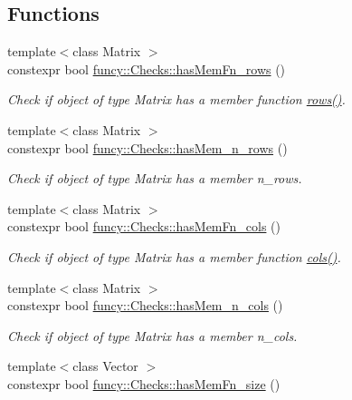 \subsection*{Functions}
\begin{DoxyCompactItemize}
\item 
{\footnotesize template$<$class Matrix $>$ }\\constexpr bool \hyperlink{group__ConceptCheck_gab1d22f4faad380ccd489734763c5f39c}{funcy\-::\-Checks\-::has\-Mem\-Fn\-\_\-rows} ()
\begin{DoxyCompactList}\small\item\em Check if object of type Matrix has a member function \hyperlink{namespacefuncy_1_1LinearAlgebra_aea4d8c30f47543a340dd7d1efda08b6d}{rows()}. \end{DoxyCompactList}\item 
{\footnotesize template$<$class Matrix $>$ }\\constexpr bool \hyperlink{group__ConceptCheck_gaaa8a18550989f64d04281c686b0d5ebd}{funcy\-::\-Checks\-::has\-Mem\-\_\-n\-\_\-rows} ()
\begin{DoxyCompactList}\small\item\em Check if object of type Matrix has a member n\-\_\-rows. \end{DoxyCompactList}\item 
{\footnotesize template$<$class Matrix $>$ }\\constexpr bool \hyperlink{group__ConceptCheck_gaba617e734e07fb6c0ef1c519149d9381}{funcy\-::\-Checks\-::has\-Mem\-Fn\-\_\-cols} ()
\begin{DoxyCompactList}\small\item\em Check if object of type Matrix has a member function \hyperlink{namespacefuncy_1_1LinearAlgebra_adee762dc2457194e15c0a5e678babcb2}{cols()}. \end{DoxyCompactList}\item 
{\footnotesize template$<$class Matrix $>$ }\\constexpr bool \hyperlink{group__ConceptCheck_ga196a98efffbe30b11cce354aee5a5b0b}{funcy\-::\-Checks\-::has\-Mem\-\_\-n\-\_\-cols} ()
\begin{DoxyCompactList}\small\item\em Check if object of type Matrix has a member n\-\_\-cols. \end{DoxyCompactList}\item 
{\footnotesize template$<$class Vector $>$ }\\constexpr bool \hyperlink{group__ConceptCheck_ga48c01f7921e57edba22ceb78efabd580}{funcy\-::\-Checks\-::has\-Mem\-Fn\-\_\-size} ()

\end{DoxyCompactItemize}

